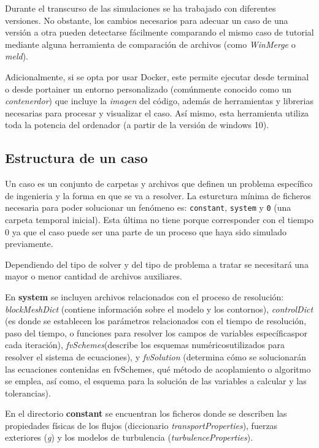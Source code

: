 Durante el transcurso de las simulaciones se ha trabajado con diferentes
versiones. No obstante, los cambios necesarios para adecuar un caso de
una versión a otra pueden detectarse fácilmente comparando el mismo caso
de tutorial mediante alguna herramienta de comparación de archivos (como
\emph{WinMerge} o \emph{meld}).

Adicionalmente, si se opta por usar
Docker\cite{dockerwin}, este permite
ejecutar desde terminal o desde portainer \cite{portainer} un entorno
personalizado (comúnmente conocido como un \emph{contenerdor}) que
incluye la \emph{imagen} del código, además de herramientas y librerias
necesarias para procesar y visualizar el caso. Así mismo, esta
herramienta utiliza toda la potencia del ordenador (a partir de la
versión de windows 10).

\subsection{Estructura de un caso}\label{header-n103}

Un caso es un conjunto de carpetas y archivos que definen un problema
específico de ingenieria y la forma en que se va a resolver. La
esturctura mínima de ficheros necesaria para poder solucionar un
fenómeno es: \texttt{constant}, \texttt{system} y \texttt{0} (una
carpeta temporal inicial). Esta última no tiene porque corresponder con
el tiempo $0$ ya que el caso puede ser una parte de un proceso que
haya sido simulado previamente.

Dependiendo del tipo de solver y del tipo de problema a tratar se
necesitará una mayor o menor cantidad de archivos auxiliares.

En \textbf{system} se incluyen archivos relacionados con el proceso de
resolución: \emph{blockMeshDict} (contiene información sobre el modelo y
los contornos), \emph{controlDict} (es donde se establecen los
parámetros relacionados con el tiempo de resolución, paso del tiempo, o
funciones para resolver los campos de variables específicaspor cada
iteración), \emph{fvSchemes}(describe los esquemas numéricosutilizados
para resolver el sistema de ecuaciones), y \emph{fvSolution} (determina
cómo se solucionarán las ecuaciones contenidas en fvSchemes, qué método
de acoplamiento o algoritmo se emplea, así como, el esquema para la
solución de las variables a calcular y las tolerancias).

En el directorio \textbf{constant} se encuentran los ficheros donde se
describen las propiedades físicas de los flujos (diccionario
\emph{transportProperties}), fuerzas exteriores (\emph{g}) y los modelos
de turbulencia (\emph{turbulenceProperties}).

